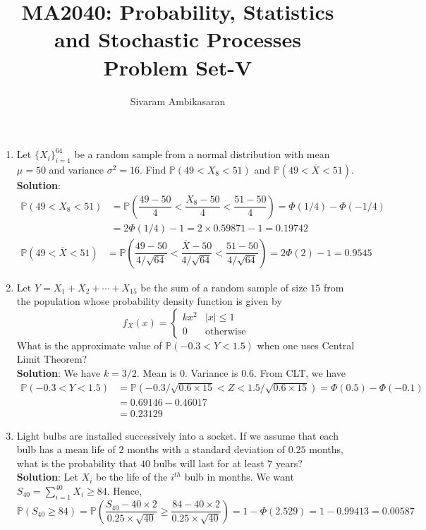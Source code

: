 \documentclass{article}
\title{MA2040: Probability, Statistics and Stochastic Processes\\
Problem Set-V}
\author{Sivaram Ambikasaran}
\newcommand{\dsum}{\displaystyle\sum}
\newcommand{\abs}[1]{\displaystyle\left\lvert#1\right\rvert}
\newcommand{\Pb}{\mathbb{P}}
\newcommand{\soln}[1]{\textbf{Solution}:#1}
\newcommand{\bkt}[1]{\left(#1\right)}
\begin{document}
	\maketitle
	\begin{enumerate}
		\item
		Let $\{X_i\}_{i=1}^{64}$ be a random sample from a normal distribution with mean $\mu = 50$ and variance $\sigma^2=16$. Find $\Pb\bkt{49 < X_8 < 51}$ and $\Pb\bkt{49 < \overline{X} < 51}$.\\
		\soln{
		\begin{align}
			\Pb\bkt{49 < X_8 < 51} & = \Pb\bkt{\dfrac{49-50}4 < \dfrac{X_8-50}4 < \dfrac{51-50}4} = \Phi\bkt{1/4} - \Phi(-1/4)\\
			& = 2\Phi\bkt{1/4}-1 = 2 \times 0.59871-1 = 0.19742
		\end{align}
		\begin{align}
			\Pb\bkt{49 < \overline{X} < 51} & = \Pb\bkt{\dfrac{49-50}{4/\sqrt{64}} < \dfrac{\overline{X}-50}{4/\sqrt{64}} < \dfrac{51-50}{4/\sqrt{64}}} = 2 \Phi\bkt{2}-1 = 0.9545
		\end{align}
		}
		\item
		Let $Y = X_1+X_2+\cdots+X_{15}$ be the sum of a random sample of size $15$ from the population whose probability density function is given by
		$$f_X(x) = \begin{cases}
		kx^2 & \abs{x} \leq 1\\
		0 & \text{otherwise}
		\end{cases}$$
		What is the approximate value of $\Pb\bkt{-0.3<Y<1.5}$ when one uses Central Limit Theorem?\\
		\soln{
		We have $k=3/2$. Mean is $0$. Variance is $0.6$. From CLT, we have
		\begin{align}
			\Pb\bkt{-0.3<Y<1.5} & = \Pb\bkt{-0.3/\sqrt{0.6 \times 15} < Z < 1.5/\sqrt{0.6 \times 15}} = \Phi\bkt{0.5} - \Phi\bkt{-0.1}\\
			& = 0.69146-0.46017\\
			& = 0.23129
		\end{align}}
		\item
		Light bulbs are installed successively into a socket. If we assume that each bulb has a mean life of $2$ months with a standard deviation of $0.25$ months, what is the probability that $40$ bulbs will last for at least $7$ years?\\
		\soln{
		Let $X_i$ be the life of the $i^{th}$ bulb in months. We want $S_{40} = \dsum_{i=1}^{40}X_i \geq 84$. Hence,
		$$\Pb\bkt{S_{40} \geq 84} = \Pb\bkt{\dfrac{S_{40}-40 \times 2}{0.25 \times \sqrt{40}} \geq \dfrac{84-40 \times 2}{0.25 \times \sqrt{40}}} = 1- \Phi\bkt{2.529} = 1-0.99413 = 0.00587$$
}
\end{enumerate}
\end{document}
